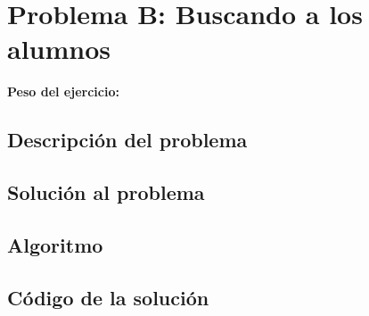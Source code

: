 \newpage{}
\section{Problema B:  Buscando a los alumnos}
\textbf{Peso del ejercicio: }
\subsection{Descripción del problema}

\subsection{Solución al problema}

\subsection{Algoritmo}

\newpage
\subsection{Código de la solución}
\lstset{inputencoding=utf8/latin1}

